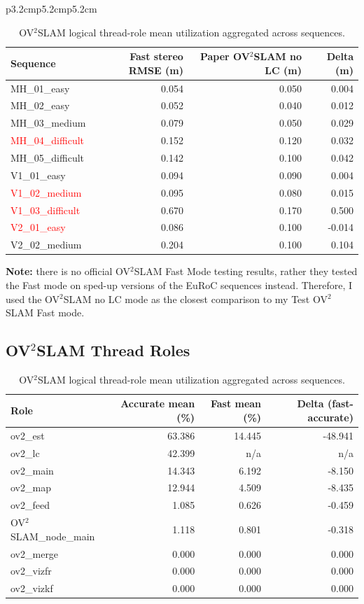 \documentclass[11pt]{article}
\begin{document}
\begin{table}[ht]
\begin{tabular}{p{3.2cm}p{5.2cm}p{5.2cm}}
\begin{table}[H]
\centering
\small
\caption{OV$^{2}$SLAM fast stereo vs OV$^{2}$SLAM paper stereo rows without loop closure.}
\label{tab:ov2_fast_vs_paper}
\begin{tabular}{lrrr}
\toprule
Sequence & Fast stereo RMSE (m) & Paper OV$^{2}$SLAM no LC (m) & Delta (m) \\
\midrule
MH\_01\_easy & 0.054 & 0.050 & 0.004 \\
MH\_02\_easy & 0.052 & 0.040 & 0.012 \\
MH\_03\_medium & 0.079 & 0.050 & 0.029 \\
\textcolor{red}{MH\_04\_difficult} & 0.152 & 0.120 & 0.032 \\
MH\_05\_difficult & 0.142 & 0.100 & 0.042 \\
V1\_01\_easy & 0.094 & 0.090 & 0.004 \\
\textcolor{red}{V1\_02\_medium} & 0.095 & 0.080 & 0.015 \\
\textcolor{red}{V1\_03\_difficult} & 0.670 & 0.170 & 0.500 \\
\textcolor{red}{V2\_01\_easy} & 0.086 & 0.100 & -0.014 \\
V2\_02\_medium & 0.204 & 0.100 & 0.104 \\
\bottomrule
\end{tabular}
\end{table}
\textbf{Note:} there is no official OV$^{2}$SLAM Fast Mode testing results, rather they tested the Fast mode on sped-up versions of the EuRoC sequences instead. Therefore, I used the OV$^{2}$SLAM no LC mode as the closest comparison to my Test OV$^{2}$SLAM Fast mode.

\subsection{OV$^{2}$SLAM Thread Roles}
\begin{table}[H]
\centering
\scriptsize
\caption{OV$^{2}$SLAM logical thread-role mean utilization aggregated across sequences.}
\label{tab:ov2_role_means_table}
\begin{tabular}{lrrr}
\toprule
Role & Accurate mean (\%) & Fast mean (\%) & Delta (fast-accurate) \\
\midrule
ov2\_est & 63.386 & 14.445 & -48.941 \\
ov2\_lc & 42.399 & n/a & n/a \\
ov2\_main & 14.343 & 6.192 & -8.150 \\
ov2\_map & 12.944 & 4.509 & -8.435 \\
ov2\_feed & 1.085 & 0.626 & -0.459 \\
OV$^{2}$SLAM\_node\_main & 1.118 & 0.801 & -0.318 \\
ov2\_merge & 0.000 & 0.000 & 0.000 \\
ov2\_vizfr & 0.000 & 0.000 & 0.000 \\
ov2\_vizkf & 0.000 & 0.000 & 0.000 \\
\bottomrule
\end{tabular}
\end{table}


\end{tabular}
\end{table}
\end{document}
